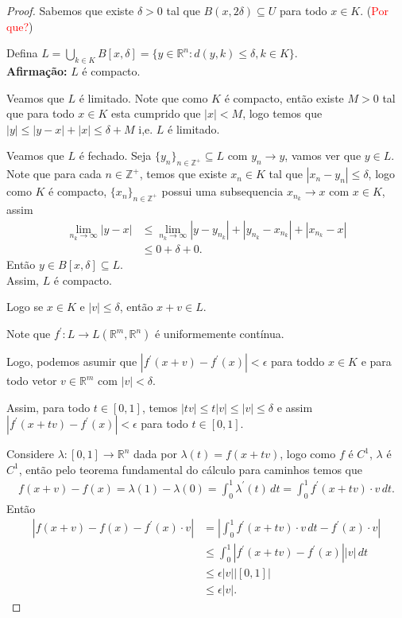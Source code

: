 \begin{proof} 
  Sabemos que existe $\delta>0$ tal que $B(x,2\delta)\subseteq U$ para todo $x\in K$. (\textcolor{red}{Por que?})

  Defina $L=\bigcup_{k\in K}B[x,\delta]=\{y\in \mathbb{R}^{n}:d(y,k)\leq \delta,k\in K\}$.\\
  \textbf{Afirmação:} $L$ é compacto.

  Veamos que $L$ é limitado. Note que como $K$ é compacto, então existe $M>0$ tal que para todo $x\in K$ esta cumprido que $|x|< M$, logo temos que $|y|\leq |y-x|+|x|\leq \delta + M$ i,e. $L$ é limitado.

  Veamos que $L$ é fechado. Seja $\{y_n\}_{n\in\mathbb{Z}^{+}}\subseteq L$ com $y_n\to y$, vamos ver que $y\in L$. Note que para cada $n\in\mathbb{Z}^{+}$, temos que existe $x_n\in K$ tal que $|x_n-y_n|\leq \delta$, logo como $K$ é compacto, $\{x_n\}_{n\in\mathbb{Z}^{+}}$ possui uma subsequencia $x_{n_k}\to x$ com $x\in K$, assim
  \begin{align*}
    \lim_{n_k \to \infty}|y-x|&\leq \lim_{n_k \to \infty}|y-y_{n_k}|+|y_{n_k}-x_{n_k}|+|x_{n_k}-x|\\
    &\leq 0 + \delta + 0.
  \end{align*}
  Então $y\in B[x,\delta]\subseteq L$.\\
  Assim, $L$ é compacto.

  Logo se $x\in K$ e $|v|\leq \delta$, então $x+v\in L$.

  Note que $f^{\prime}:L\to L(\mathbb{R}^{m},\mathbb{R}^{n})$ é uniformemente contínua.

  Logo, podemos asumir que $|f^{\prime}(x+v)-f^{\prime}(x)|<\epsilon$ para toddo $x\in K$ e para todo vetor $v\in\mathbb{R}^{m}$ com $|v|<\delta$.

  Assim, para todo $t\in[0,1]$, temos $|tv|\leq t|v|\leq |v|\leq \delta$ e assim $|f^{\prime}(x+tv)-f^{\prime}(x)|<\epsilon$ para todo $t\in[0,1]$.

  Considere $\lambda:[0,1]\to\mathbb{R}^{n}$ dada por $\lambda(t)=f(x+tv)$, logo como $f$ é $C^{1}$, $\lambda$ é $C^{1}$, então pelo teorema fundamental do cálculo para caminhos temos que
  \begin{align*}
    f(x+v)-f(x)=\lambda(1)-\lambda(0)=\int_{0}^{1}\lambda^{\prime}(t)\,dt=\int_{0}^{1}f^{\prime}(x+tv)\cdot v\,dt.
  \end{align*}
  Então
  \begin{align*}
    |f(x+v)-f(x)-f^{\prime}(x)\cdot v|&=\left| \int_{0}^{1}f^{\prime}(x+tv)\cdot v\,dt -f^{\prime}(x)\cdot v\right|\\
    &\leq \int_{0}^{1}\left| f^{\prime}(x+tv)-f^{\prime}(x) \right||v|\,dt\\
    &\leq \epsilon |v||[0,1]|\\
    &\leq \epsilon |v|.
  \end{align*}
\end{proof}
